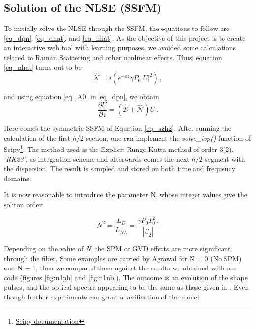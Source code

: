         \subsection{Solution of the NLSE (SSFM)}\label{subsec:nlse}
            To initially solve the NLSE through the SSFM, the equations to follow are \eqref{eq_dpn}, \eqref{eq_dhat}, and \eqref{eq_nhat}. As the objective of this project is to create an interactive web tool with learning purposes, we avoided some calculations related to Raman Scattering and other nonlinear effects. Thus, equation \eqref{eq_nhat} turns out to be 
            \begin{equation} \label{eq_nhat2}
             \hat{\mathcal{N}} = i \left( 
             e^{-\alpha z} \gamma P_0 \left|U\right|^2 
             \right) \ ,
        \end{equation}
        
        and using equation \eqref{eq_A0} in \eqref{eq_dpn}, we obtain
        \begin{equation}\label{eq_dpn2}
            \frac{\partial U}{\partial z} = \left( \hat{\mathcal{D}} + \hat{\mathcal{N}} \right) U \ . 
        \end{equation}
        
        Here comes the symmetric SSFM of Equation \eqref{eq_azh2}. After running the calculation of the first $h/2$ section, one can implement the \emph{solve\_ivp()} function of Scipy\footnote{\href{https://docs.scipy.org/doc/scipy/reference/generated/scipy.integrate.solve_ivp.html}{Scipy documentation}}. The method used is the Explicit Runge-Kutta method of order 3(2), \emph{'RK23'}, as integration scheme and afterwards comes the next $h/2$ segment with the dispersion. The result is sampled and stored on both time and frequency domains. 
        
        It is now reasonable to introduce the parameter N, whose integer values give the soliton order:
        
        \begin{equation}\label{eq_n}
            N^2 = \frac{L_D}{L_{NL}} = \frac{\gamma P_0 T^2_0 \ . }{\left|\beta_2\right|}
        \end{equation}
        
        
        Depending on the value of \emph{N}, the SPM or GVD effects are more significant through the fiber. Some examples are carried by Agrawal \citep{AgrawalBook} for N = 0 (No SPM) and N = 1, then we compared them against the results we obtained with our code (figures \ref{fig:n1pb} and \ref{fig:n1nb}). The outcome is an evolution of the shape pulses, and the optical spectra appearing to be the same as those given in \citep{AgrawalBook}. Even though further experiments can grant a verification of the model.
        
